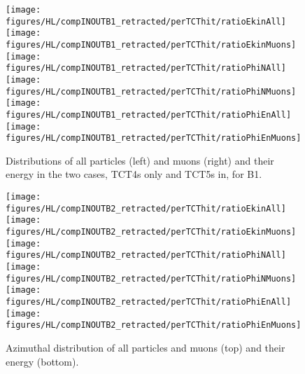 \begin{figure}
\centering
\texttt{[image: figures/HL/compINOUTB1\_retracted/perTCThit/ratioEkinAll]}
\texttt{[image: figures/HL/compINOUTB1\_retracted/perTCThit/ratioEkinMuons]}
\texttt{[image: figures/HL/compINOUTB1\_retracted/perTCThit/ratioPhiNAll]}
\texttt{[image: figures/HL/compINOUTB1\_retracted/perTCThit/ratioPhiNMuons]}
\texttt{[image: figures/HL/compINOUTB1\_retracted/perTCThit/ratioPhiEnAll]}
\texttt{[image: figures/HL/compINOUTB1\_retracted/perTCThit/ratioPhiEnMuons]}
 \caption{Distributions of all particles (left) and muons (right) and their energy in the two cases, TCT4s only and TCT5s in, for B1.
  \label{fig:compInOutB1_perTCThit}}
\end{figure}




\begin{figure}
\begin{center}
\texttt{[image: figures/HL/compINOUTB2\_retracted/perTCThit/ratioEkinAll]}
\texttt{[image: figures/HL/compINOUTB2\_retracted/perTCThit/ratioEkinMuons]}
\texttt{[image: figures/HL/compINOUTB2\_retracted/perTCThit/ratioPhiNAll]}
\texttt{[image: figures/HL/compINOUTB2\_retracted/perTCThit/ratioPhiNMuons]}
\texttt{[image: figures/HL/compINOUTB2\_retracted/perTCThit/ratioPhiEnAll]}
\texttt{[image: figures/HL/compINOUTB2\_retracted/perTCThit/ratioPhiEnMuons]}
\end{center}
\vspace{-0.6cm}
 \caption{Azimuthal distribution of all particles and muons (top) and their energy (bottom).
  \label{fig:compInOutB2}}
\end{figure}

